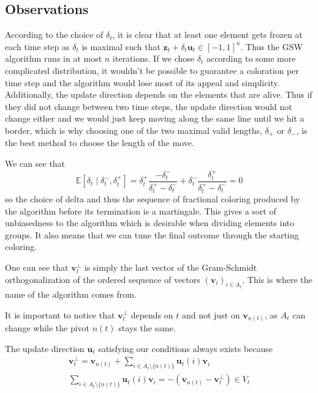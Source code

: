 \documentclass[12pt]{article}
\begin{document}

\subsection{Observations}
According to the choice of $\delta_t$, it is clear that at least one element gets frozen at each time step as $\delta_t$ is maximal such that $\textbf{z}_t+\delta_t\textbf{u}_t\in[-1,1]^n$. Thus the GSW algorithm runs in at most $n$ iterations. If we chose $\delta_t$ according to some more complicated distribution, it wouldn't be possible to guarantee a coloration per time step and the algorithm would lose most of its appeal and simplicity. Additionally, the update direction depends on the elements that are alive. Thus if they did not change between two time steps, the update direction would not change either and we would just keep moving along the same line until we hit a border, which is why choosing one of the two maximal valid lengths, $\delta_+$ or $\delta_-$, is the best method to choose the length of the move.

We can see that
$$\mathbb{E}[\delta_t \mid \delta_t^-, \delta_t^+] = \delta_t^+\frac{-\delta_t^-}{\delta_t^+-\delta_t^-} + \delta_t^- \frac{\delta_t^+}{\delta_t^+-\delta_t^-} =0$$
so the choice of delta and thus the sequence of fractional coloring produced by the algorithm before its termination is a martingale. This gives a sort of unbiasedness to the algorithm which is desirable when dividing elements into groups. It also means that we can tune the final outcome through the starting coloring.

One can see that $\textbf{v}^\perp _t$ is simply the last vector of the Gram-Schmidt orthogonalization of the ordered sequence of vectors $(\textbf{v}_i)_{i\in A_t}$. This is where the name of the algorithm comes from.

It is important to notice that $\textbf{v}^{\perp}_t$ depends on $t$ and not just on $\textbf{v}_{n(t)}$, as $A_t$ can change while the pivot $n(t)$ stays the same.

The update direction $\textbf{u}_t$ satisfying our conditions always exists because
\begin{align*}
        \textbf{v}^\perp_t = \textbf{v}_{n(t)} + \sum_{i \in A_t \setminus \{n(t)\}} \textbf{u}_t(i)\textbf{v}_i\\
        \sum_{i \in A_t \setminus \{n(t)\}} \textbf{u}_t(i)\textbf{v}_i = -(\textbf{v}_{n(t)} - \textbf{v}^\perp_t) \in V_t
\end{align*}
\end{document}
